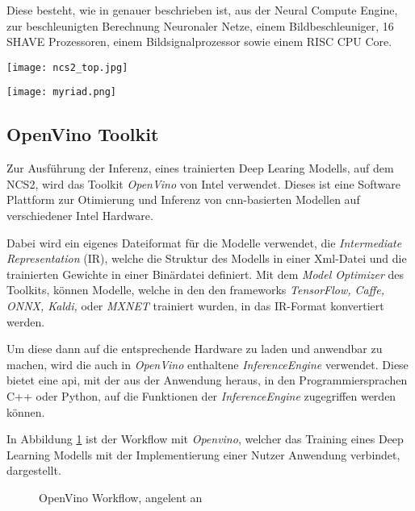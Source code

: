 Diese besteht, wie in
\cite{haussermannFunktionUndEffizienz} genauer 
beschrieben ist, aus der Neural Compute Engine, 
zur beschleunigten Berechnung Neuronaler Netze,
einem Bildbeschleuniger, 16 SHAVE Prozessoren, einem 
Bildsignalprozessor sowie einem RISC CPU Core.

\vspace{1cm}
\begin{minipage}{0.4\textwidth}
    \centering
    \texttt{[image: ncs2\_top.jpg]}
    \label{fig:ncs2}
\end{minipage}
\begin{minipage}{0.6\textwidth}
    \centering
    \texttt{[image: myriad.png]}
    \label{fig:myriad}
\end{minipage}


\subsection{OpenVino Toolkit}

Zur Ausführung der Inferenz, eines trainierten Deep Learing
Modells, auf dem NCS2, wird das Toolkit 
\textit{OpenVino} von Intel verwendet.
Dieses ist eine Software Plattform zur Otimierung und Inferenz 
von \Gls{cnn}-basierten Modellen auf verschiedener Intel Hardware.

Dabei wird ein eigenes Dateiformat für die Modelle verwendet, 
die \textit{Intermediate Representation} (IR),
welche die Struktur des Modells 
in einer Xml-Datei und die trainierten Gewichte in 
einer Binärdatei definiert.
Mit dem \textit{Model Optimizer} des Toolkits,
können Modelle, welche in den den \Glspl{framework} \textit{TensorFlow,
Caffe, ONNX, Kaldi,} oder \textit{MXNET} trainiert wurden, 
in das IR-Format konvertiert werden.

Um diese dann auf die entsprechende Hardware zu laden und anwendbar 
zu machen, wird die auch in \textit{OpenVino} enthaltene
\textit{InferenceEngine} verwendet.
Diese bietet eine \Gls{api}, mit der aus der Anwendung
 heraus, in den Programmiersprachen C++ oder Python,
  auf die Funktionen der 
\textit{InferenceEngine} zugegriffen werden können.


In Abbildung \ref{fig:openvinoflow} ist der Workflow mit 
\textit{Openvino}, welcher das Training eines
 Deep Learning Modells mit der Implementierung
  einer Nutzer Anwendung verbindet, 
dargestellt.


\vspace{1cm}
\begin{figure}[H]
    \centering
    \def\svgwidth{0.8\textwidth}
    
    \caption{OpenVino Workflow, angelent an 
    \cite{openvinoflow}}
    \label{fig:openvinoflow}
\end{figure}
